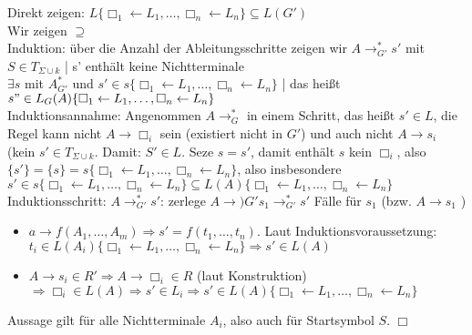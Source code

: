 \documentclass[titlepage]{article}
\begin{document}
Direkt zeigen: $L\{ \Box_1 \leftarrow L_1, \dots, \Box_n \leftarrow L_n \} \subseteq L(G')$\\
Wir zeigen \glqq $\supseteq$ \grqq\\
Induktion: \"uber die Anzahl der Ableitungsschritte zeigen wir
$A \to_{G'}^\ast s'$ mit $S \in T_{\Sigma \cup k}$ | s' enth\"alt keine Nichtterminale\\
$\exists s$ mit $A_{G'}^\ast$ und $s' \in s\{ \Box_1 \leftarrow L_1, \dots, \Box_n \leftarrow L_n \}$ |
das hei\ss t $s" \in L_G(A)\{ \Box_1 \leftarrow L_1, \dots, \Box_n \leftarrow L_n \}$\\

Induktionsannahme: Angenommen $A \to_G^\ast$ in einem Schritt, das hei\ss t $s' \in L$, die Regel
kann nicht $A \to \Box_i$ sein (existiert nicht in $G'$) und auch nicht $A \to s_i$ 
(kein $s' \in T_{\Sigma \cup k}$. Damit: $S' \in L$. Seze $s = s'$, damit enth\"alt $s$ kein $\Box_i$, also
$\{s'\} = \{s\} = s\{ \Box_1 \leftarrow L_1, \dots, \Box_n \leftarrow L_n \}$, also insbesondere
$s' \in s\{ \Box_1 \leftarrow L_1, \dots, \Box_n \leftarrow L_n \} \subseteq 
L(A)\{ \Box_1 \leftarrow L_1, \dots, \Box_n \leftarrow L_n \}$\\
Induktionsschritt: $A \to_{G'}^\ast s'$: zerlege $A \to){G'} s_1 \to^\ast_{G'} s'$
F\"alle f\"ur $s_1$ (bzw. $A \to s_1$ )
\begin{itemize}
	\item $a \to f(A_1, \dots, A_m) \Rightarrow s' = f(t_1, \dots, t_n)$. Laut Induktionsvoraussetzung:
		$t_i \in L(A_i)\{ \Box_1 \leftarrow L_1, \dots, \Box_n \leftarrow L_n \} \Rightarrow s' \in L(A)$
	\item $A \to s_i \in R' \Rightarrow A \to \Box_i \in R$ (laut Konstruktion) 
		$\Rightarrow \Box_i \in L(A) \Rightarrow s' \in L_i \Rightarrow s' \in 
		L(A)\{ \Box_1 \leftarrow L_1, \dots, \Box_n \leftarrow L_n \}$
\end{itemize}

Aussage gilt f\"ur  alle Nichtterminale $A_i$, also auch f\"ur Startsymbol $S$. $\Box$
\end{document}
